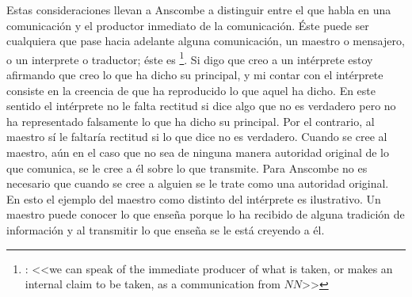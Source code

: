 Estas consideraciones llevan a Anscombe a distinguir entre el que habla en una
comunicación y el productor inmediato de la
comunicación\autocite[Cf.~][8]{anscombe2008faith:tobelieve}. Éste puede ser
cualquiera que pase hacia adelante alguna comunicación, un maestro o mensajero,
o un interprete o traductor; éste es \footnote{\cite[8]{anscombe2008faith:tobelieve}:
  <<we can speak of the immediate producer of what is taken, or makes an
  internal claim to be taken, as a communication from $NN$>>}. Si digo que creo
a un intérprete estoy afirmando que creo lo que ha dicho su principal, y mi
contar con el intérprete consiste en la creencia de que ha reproducido lo que
aquel ha dicho. En este sentido el intérprete no le falta rectitud si dice algo
que no es verdadero pero no ha representado falsamente lo que ha dicho su
principal. Por el contrario, al maestro sí le faltaría rectitud si lo que dice
no es verdadero. Cuando se cree al maestro, aún en el caso que no sea de ninguna
manera autoridad original de lo que comunica, se le cree a él sobre lo que
transmite. Para Anscombe no es necesario que cuando se cree a alguien se le
trate como una autoridad
original\autocite[Cf.~][5]{anscombe2008faith:tobelieve}. En esto el ejemplo del
maestro como distinto del intérprete es ilustrativo. Un maestro puede conocer lo
que enseña porque lo ha recibido de alguna tradición de información y al
transmitir lo que enseña se le está creyendo a él.

